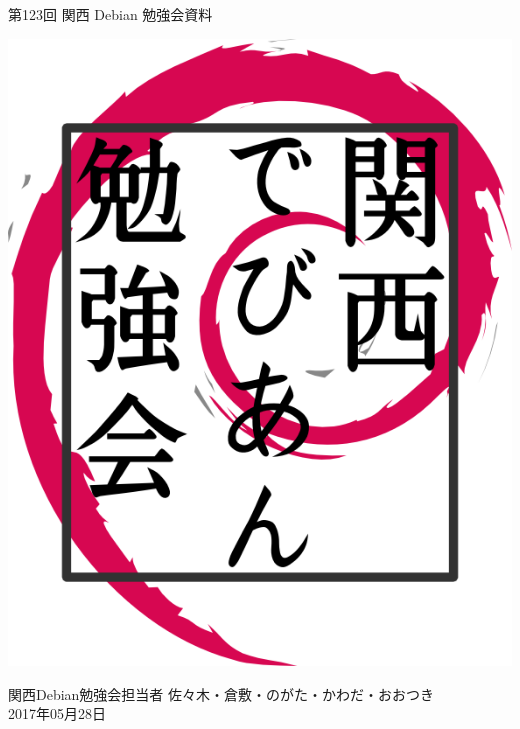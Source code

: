 \documentclass[mingoth,a4paper]{jsarticle}
\newcommand{\debmtgyear}{2017}
\newcommand{\debmtgdate}{28}
\newcommand{\debmtgmonth}{05}
\newcommand{\debmtgnumber}{123}
\begin{document}
\begin{titlepage}


  第\debmtgnumber{}回 関西 Debian 勉強会資料

  \vspace{2cm}

  \begin{center}
    \includegraphics{image200802/kansaidebianlogo.png}
  \end{center}

  \begin{flushright}
    \hfill{}関西Debian勉強会担当者 佐々木・倉敷・のがた・かわだ・おおつき \\
    \hfill{}\debmtgyear{}年\debmtgmonth{}月\debmtgdate{}日
  \end{flushright}

  \thispagestyle{empty}
\end{titlepage}

\end{document}
